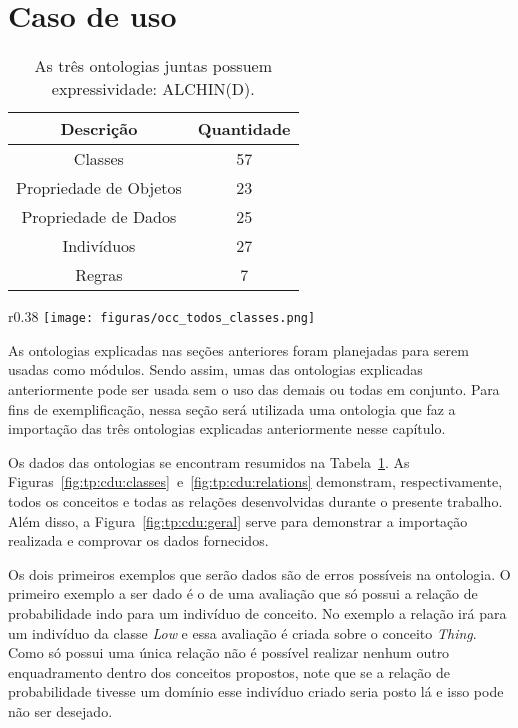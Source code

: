 \section{Caso de uso} \label{cap:tp:cdu}

\begin{table}[b]
	\caption{As três ontologias juntas possuem expressividade: ALCHIN(D).}
	\label{tab:tp:cdu:geral}
	\begin{center}
	\begin{tabular}{|c|c|}
		\hline
		Descrição & Quantidade \\ \hline
		Classes &  57 		\\ \hline
		Propriedade de Objetos & 23 \\ \hline
		Propriedade de Dados & 25 \\ \hline
		Indivíduos &  27	\\ \hline
		Regras & 7 \\ \hline
	\end{tabular}
	\end{center}
\end{table}

\begin{wrapfigure}{r}{0.38\textwidth}
  \texttt{[image: figuras/occ\_todos\_classes.png]}
  \caption{Taxonomia das 3 ontologias.}
  \label{fig:tp:cdu:classes}
\end{wrapfigure}

As ontologias explicadas nas seções anteriores foram planejadas para serem
usadas como módulos. Sendo assim, umas das ontologias explicadas anteriormente
pode ser usada sem o uso das demais ou todas em conjunto. Para fins de
exemplificação, nessa seção será utilizada uma ontologia que faz a importação
das três ontologias explicadas anteriormente nesse capítulo.

Os dados das ontologias se encontram resumidos na
Tabela~\ref{tab:tp:cdu:geral}. As
Figuras~\ref{fig:tp:cdu:classes}~e~\ref{fig:tp:cdu:relations} demonstram,
respectivamente, todos os conceitos e todas as relações desenvolvidas durante
o presente trabalho. Além disso, a Figura~\ref{fig:tp:cdu:geral} serve para
demonstrar a importação realizada e comprovar os dados fornecidos.

Os dois primeiros exemplos que serão dados são de erros possíveis na
ontologia. O primeiro exemplo a ser dado é o de uma avaliação que só
possui a relação de probabilidade indo para um indivíduo de conceito. No
exemplo a relação irá para um indivíduo da classe \emph{Low} e essa avaliação
é criada sobre o conceito \emph{Thing}. Como só possui uma única relação não é
possível realizar nenhum outro enquadramento dentro dos conceitos propostos,
note que se a relação de probabilidade tivesse um domínio esse indivíduo
criado seria posto lá e isso pode não ser desejado.

